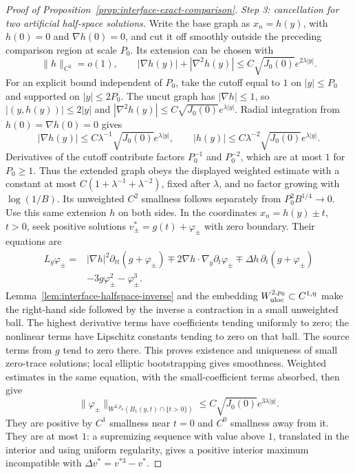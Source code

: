 \begin{proof}[Proof of Proposition~\ref{prop:interface-exact-comparison}]
\emph{Step 3: cancellation for two artificial half-space solutions.}
Write the base graph as $x_n=h(y)$, with $h(0)=0$ and
$\nabla h(0)=0$, and cut it off smoothly outside the preceding
comparison region at scale $P_0$.  Its extension can be chosen with
\[
 \|h\|_{C^2}=o(1),\qquad
 |\nabla h(y)|+|\nabla^2h(y)|
          \le C\sqrt{J_0(0)}e^{2\lambda|y|}.
\]
For an explicit bound independent of $P_0$, take the cutoff equal
to $1$ on $|y|\le P_0$ and supported on $|y|\le2P_0$.
The uncut graph has $|\nabla h|\le1$, so
$|(y,h(y))|\le2|y|$ and
$|\nabla^2h(y)|\le C\sqrt{J_0(0)}e^{\lambda|y|}$.
Radial integration from $h(0)=\nabla h(0)=0$ gives
\[
 |\nabla h(y)|\le C\lambda^{-1}\sqrt{J_0(0)}e^{\lambda|y|},
 \qquad
 |h(y)|\le C\lambda^{-2}\sqrt{J_0(0)}e^{\lambda|y|}.
\]
Derivatives of the cutoff contribute factors $P_0^{-1}$ and
$P_0^{-2}$, which are at most $1$ for $P_0\ge1$.  Thus the extended
graph obeys the displayed weighted estimate with a constant at most
$C(1+\lambda^{-1}+\lambda^{-2})$, fixed after $\lambda$, and no
factor growing with $\log(1/B)$.  Its unweighted $C^2$ smallness
follows separately from $P_0^2B^{1/4}\to0$.
Use this same extension $h$ on both sides.  In the coordinates
$x_n=h(y)\pm t$, $t>0$, seek positive solutions
$v^*_\pm=g(t)+\varphi_\pm$ with zero boundary.  Their equations are
\begin{equation}\label{eq:L7}
 \begin{split}
 L_g\varphi_\pm={}&|\nabla h|^2\partial_{tt}(g+\varphi_\pm)
 \mp2\nabla h\cdot\nabla_y\partial_t\varphi_\pm
 \mp\Delta h\,\partial_t(g+\varphi_\pm)\\
 &-3g\varphi_\pm^2-\varphi_\pm^3.
 \end{split}
\end{equation}
Lemma~\ref{lem:interface-halfspace-inverse} and the embedding
$W^{2,p_0}_{\rm uloc}\subset C^{1,\eta}$ make the right-hand side
followed by the inverse a contraction in a small unweighted ball.
The highest derivative terms have coefficients tending uniformly
to zero; the nonlinear terms have Lipschitz constants tending to
zero on that ball.  The source terms from $g$ tend to zero there.
This proves existence and uniqueness of small zero-trace solutions;
local elliptic bootstrapping gives smoothness.  Weighted estimates
in the same equation, with the small-coefficient terms absorbed,
then give
\[
 \|\varphi_\pm\|_{W^{2,p_0}(B_1(y,t)\cap\{t>0\})}
       \le C\sqrt{J_0(0)}e^{3\lambda|y|}.
\]
They are positive by $C^1$ smallness near $t=0$ and $C^0$ smallness
away from it.  They are at most $1$: a supremizing sequence with
value above $1$, translated in the interior and using uniform
regularity, gives a positive interior maximum incompatible with
$\Delta v^*=v^{*3}-v^*$.


\end{proof}
